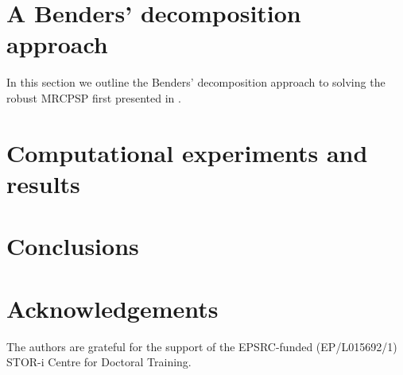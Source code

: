 \documentclass[a4paper,abstracton]{scrartcl}
\begin{document}
\section{A Benders' decomposition approach}

In this section we outline the Benders' decomposition approach to solving the robust MRCPSP first presented in \cite{balouka2021robust}.

\section{Computational experiments and results}

\section{Conclusions}


\section*{Acknowledgements}

The authors are grateful for the support of the EPSRC-funded (EP/L015692/1) STOR-i Centre for Doctoral Training.


\end{document}
